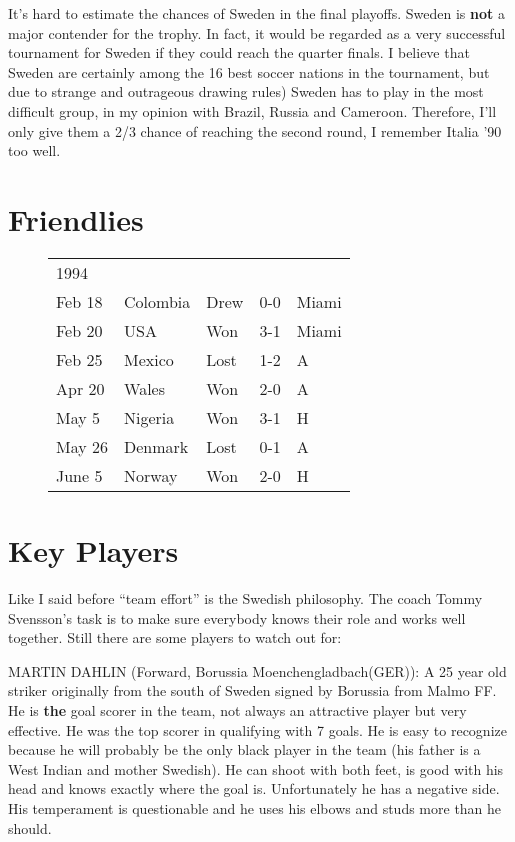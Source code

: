 It's hard to estimate the chances of Sweden in the final playoffs. Sweden is 
\textbf{not} a major contender for the trophy. In fact, it would be regarded as a
very successful tournament for Sweden if they could reach the quarter finals. I 
believe that Sweden are certainly among the 16 best soccer nations in the 
tournament, but due to strange and outrageous drawing rules) Sweden has to play 
in the most difficult group, in my opinion with Brazil, Russia and Cameroon. 
Therefore, I'll only give them a 2/3 chance of reaching the second round, I 
remember Italia '90 too well.
\section{Friendlies}
\begin{figure}[H]
\begin{tabular}{l l l c l}
1994 & & & & \\
Feb 18 & Colombia & Drew & 0-0 & Miami \\
Feb 20 & USA & Won & 3-1 & Miami \\
Feb 25 & Mexico & Lost & 1-2 & A \\
Apr 20 & Wales & Won & 2-0 & A \\
May 5 & Nigeria & Won & 3-1 & H \\
May 26 & Denmark & Lost & 0-1 & A \\
June 5 & Norway & Won & 2-0 & H \\
\end{tabular}
\end{figure}
\section{Key Players}
Like I said before ``team effort'' is the Swedish philosophy. The coach Tommy 
Svensson's task is to make sure everybody knows their role and works well 
together. Still there are some players to watch out for:

MARTIN DAHLIN (Forward, Borussia Moenchengladbach(GER)):
A 25 year old striker originally from the south of Sweden signed by Borussia
from Malmo FF. He is \textbf{the} goal scorer in the team, not always an attractive
player but very effective. He was the top scorer in qualifying with 7 goals.
He is easy to recognize because he will probably be the only black player in 
the team (his father is a West Indian and mother Swedish).
He can shoot with both feet, is good with his head and knows exactly where the
goal is. Unfortunately he has a negative side. His temperament is questionable
and he uses his elbows and studs more than he should.

